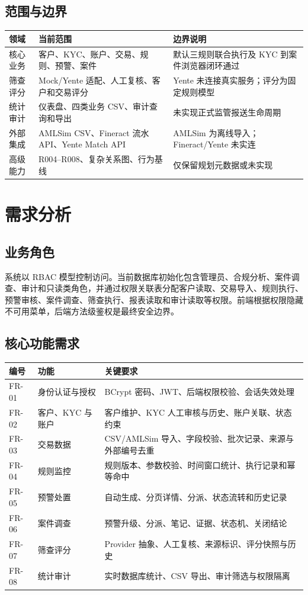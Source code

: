 \documentclass[UTF8,openany,zihao=-4]{ctexrep}
\begin{document}
\Needspace{0.62\textheight}
\section{范围与边界}
\begin{longtable}{p{}p{}p{}}
\toprule 领域 & 当前范围 & 边界说明 \\ \midrule
核心业务 & 客户、KYC、账户、交易、规则、预警、案件 & 默认三规则联合执行及 KYC 到案件浏览器闭环通过 \\
筛查评分 & Mock/Yente 适配、人工复核、客户和交易评分 & Yente 未连接真实服务；评分为固定规则模型 \\
统计审计 & 仪表盘、四类业务 CSV、审计查询和导出 & 未实现正式监管报送生命周期 \\
外部集成 & AMLSim CSV、Fineract 流水 API、Yente Match API & AMLSim 为离线导入；Fineract/Yente 未实连 \\
高级能力 & R004--R008、复杂关系图、行为基线 & 仅保留规划元数据或未实现 \\
\bottomrule
\end{longtable}

\chapter{需求分析}
\section{业务角色}
系统以 RBAC 模型控制访问。当前数据库初始化包含管理员、合规分析、案件调查、审计和只读类角色，并通过权限关联表分配客户读取、交易导入、规则执行、预警审核、案件调查、筛查执行、报表读取和审计读取等权限。前端根据权限隐藏不可用菜单，后端方法级鉴权是最终安全边界。

\Needspace{0.62\textheight}
\section{核心功能需求}
\begin{longtable}{p{}p{}p{}}
\toprule 编号 & 功能 & 关键要求 \\ \midrule
FR-01 & 身份认证与授权 & BCrypt 密码、JWT、后端权限校验、会话失效处理 \\
FR-02 & 客户、KYC 与账户 & 客户维护、KYC 人工审核与历史、账户关联、状态约束 \\
FR-03 & 交易数据 & CSV/AMLSim 导入、字段校验、批次记录、来源与外部编号去重 \\
FR-04 & 规则监控 & 规则版本、参数校验、时间窗口统计、执行记录和幂等命中 \\
FR-05 & 预警处置 & 自动生成、分页详情、分派、状态流转和历史记录 \\
FR-06 & 案件调查 & 预警升级、分派、笔记、证据、状态机、关闭结论 \\
FR-07 & 筛查评分 & Provider 抽象、人工复核、来源标识、评分快照与历史 \\
FR-08 & 统计审计 & 实时数据库统计、CSV 导出、审计筛选与权限隔离 \\
\bottomrule
\end{longtable}
\end{document}
